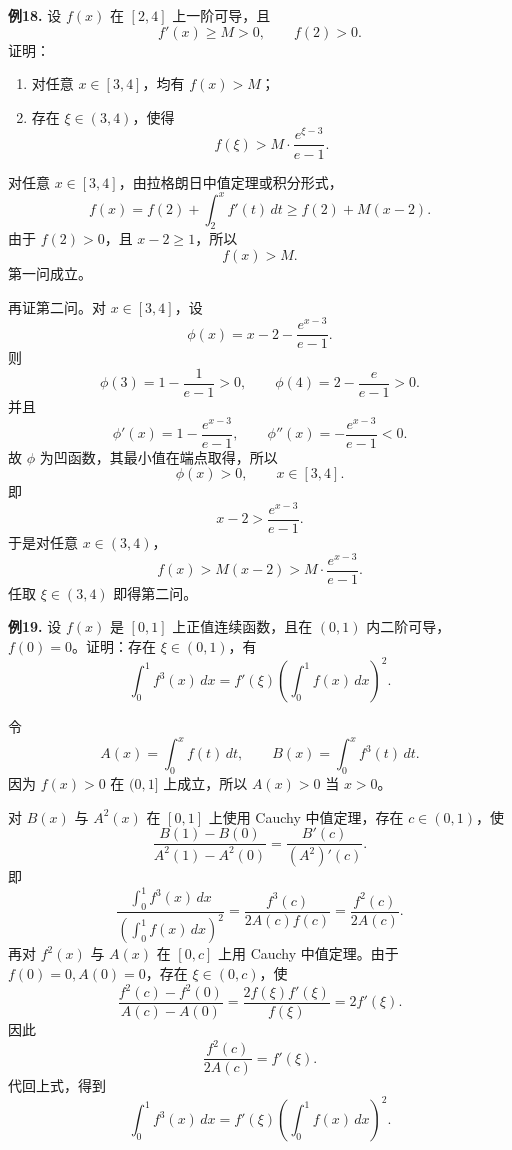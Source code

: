 \begin{problemblock}
\textbf{例18.} 设 \(f(x)\) 在 \([2,4]\) 上一阶可导，且
\[
f'(x)\ge M>0,\qquad f(2)>0.
\]
证明：
\begin{enumerate}[label=(\arabic*), leftmargin=2.2em]
\item 对任意 \(x\in[3,4]\)，均有 \(f(x)>M\)；
\item 存在 \(\xi\in(3,4)\)，使得
\[
f(\xi)>M\cdot\frac{e^{\xi-3}}{e-1}.
\]
\end{enumerate}
\end{problemblock}
\begin{solutionblock}
对任意 \(x\in[3,4]\)，由拉格朗日中值定理或积分形式，
\[
f(x)=f(2)+\int_2^x f'(t)\,dt
\ge f(2)+M(x-2).
\]
由于 \(f(2)>0\)，且 \(x-2\ge1\)，所以
\[
f(x)>M.
\]
第一问成立。

再证第二问。对 \(x\in[3,4]\)，设
\[
\phi(x)=x-2-\frac{e^{x-3}}{e-1}.
\]
则
\[
\phi(3)=1-\frac1{e-1}>0,\qquad
\phi(4)=2-\frac e{e-1}>0.
\]
并且
\[
\phi'(x)=1-\frac{e^{x-3}}{e-1},\qquad
\phi''(x)=-\frac{e^{x-3}}{e-1}<0.
\]
故 \(\phi\) 为凹函数，其最小值在端点取得，所以
\[
\phi(x)>0,\qquad x\in[3,4].
\]
即
\[
x-2>\frac{e^{x-3}}{e-1}.
\]
于是对任意 \(x\in(3,4)\)，
\[
f(x)>M(x-2)>M\cdot\frac{e^{x-3}}{e-1}.
\]
任取 \(\xi\in(3,4)\) 即得第二问。
\end{solutionblock}

\begin{problemblock}
\textbf{例19.} 设 \(f(x)\) 是 \([0,1]\) 上正值连续函数，且在 \((0,1)\) 内二阶可导，\(f(0)=0\)。证明：存在 \(\xi\in(0,1)\)，有
\[
\int_0^1 f^3(x)\,dx
=f'(\xi)\left(\int_0^1 f(x)\,dx\right)^2.
\]
\end{problemblock}
\begin{solutionblock}
令
\[
A(x)=\int_0^x f(t)\,dt,\qquad
B(x)=\int_0^x f^3(t)\,dt.
\]
因为 \(f(x)>0\) 在 \((0,1]\) 上成立，所以 \(A(x)>0\) 当 \(x>0\)。

对 \(B(x)\) 与 \(A^2(x)\) 在 \([0,1]\) 上使用 Cauchy 中值定理，存在 \(c\in(0,1)\)，使
\[
\frac{B(1)-B(0)}{A^2(1)-A^2(0)}
=\frac{B'(c)}{(A^2)'(c)}.
\]
即
\[
\frac{\int_0^1 f^3(x)\,dx}{\left(\int_0^1 f(x)\,dx\right)^2}
=\frac{f^3(c)}{2A(c)f(c)}
=\frac{f^2(c)}{2A(c)}.
\]
再对 \(f^2(x)\) 与 \(A(x)\) 在 \([0,c]\) 上用 Cauchy 中值定理。由于 \(f(0)=0,A(0)=0\)，存在 \(\xi\in(0,c)\)，使
\[
\frac{f^2(c)-f^2(0)}{A(c)-A(0)}
=\frac{2f(\xi)f'(\xi)}{f(\xi)}
=2f'(\xi).
\]
因此
\[
\frac{f^2(c)}{2A(c)}=f'(\xi).
\]
代回上式，得到
\[
\int_0^1 f^3(x)\,dx
=f'(\xi)\left(\int_0^1 f(x)\,dx\right)^2.
\]
\end{solutionblock}

